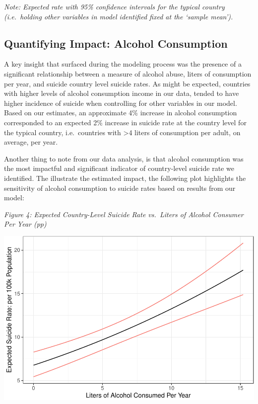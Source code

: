 \documentclass[]{article}
\begin{document}
\emph{Note: Expected rate with 95\% confidence intervals for the typical
country (i.e.~holding other variables in model identified fixed at the
`sample mean').}

\subsection{Quantifying Impact: Alcohol
Consumption}\label{quantifying-impact-alcohol-consumption}

A key insight that surfaced during the modeling process was the presence
of a significant relationship between a measure of alcohol abuse, liters
of consumption per year, and suicide country level suicide rates. As
might be expected, countries with higher levels of alcohol consumption
income in our data, tended to have higher incidence of suicide when
controlling for other variables in our model. Based on our estimates, an
approximate 4\% increase in alcohol consumption corresponded to an
expected 2\% increase in suicide rate at the country level for the
typical country, i.e.~countries with \textgreater{}4 liters of
consumption per adult, on average, per year.

Another thing to note from our data analysis, is that alcohol
consumption was the most impactful and significant indicator of
country-level suicide rate we identified. The illustrate the estimated
impact, the following plot highlights the sensitivity of alcohol
consumption to suicide rates based on results from our model:

\emph{Figure 4: Expected Country-Level Suicide Rate vs.~Liters of
Alcohol Consumer Per Year (pp)}

\begin{center}\includegraphics{Project_Report_files/figure-latex/a_alc_plot-1} \end{center}
\end{document}
